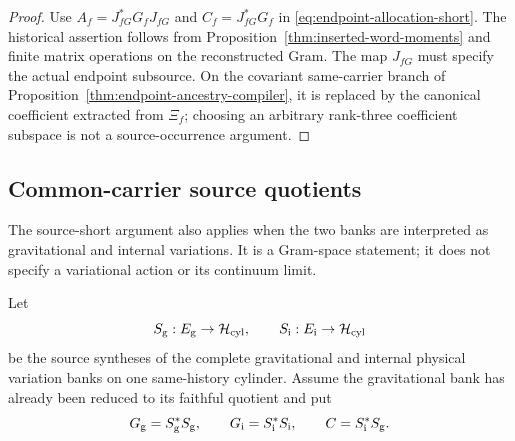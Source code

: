 \documentclass[11pt]{article}
\numberwithin{equation}{section}
\theoremstyle{definition}
\theoremstyle{remark}
\newcommand{\Hh}{\mathcal H}
\begin{document}
\begin{proof}
Use $A_f=J_{fG}^*G_fJ_{fG}$ and $C_f=J_{fG}^*G_f$ in
\eqref{eq:endpoint-allocation-short}.  The historical assertion follows from
Proposition~\ref{thm:inserted-word-moments} and finite matrix operations on the
reconstructed Gram.  The map $J_{fG}$ must specify the actual endpoint subsource.  On the
covariant same-carrier branch of
Proposition~\ref{thm:endpoint-ancestry-compiler}, it is replaced by the canonical
coefficient extracted from $\Xi_f$; choosing an arbitrary rank-three
coefficient subspace is not a source-occurrence argument.
\end{proof}


\subsection{Common-carrier source quotients}
\label{app:coupled-source}

The source-short argument also applies when the two banks are interpreted
as gravitational and internal variations.  It is a Gram-space statement;
it does not specify a variational action or its continuum limit.

Let
\[
S_{\rm g}:E_{\rm g}\to\Hh_{\rm cyl},
\qquad
S_{\rm i}:E_{\rm i}\to\Hh_{\rm cyl}
\]
be the source syntheses of the complete gravitational and internal physical
variation banks on one same-history cylinder.  Assume the gravitational bank
has already been reduced to its faithful quotient and put
\[
G_{\rm g}=S_{\rm g}^*S_{\rm g},
\qquad
G_{\rm i}=S_{\rm i}^*S_{\rm i},
\qquad
C=S_{\rm i}^*S_{\rm g}.
\]
\end{document}
